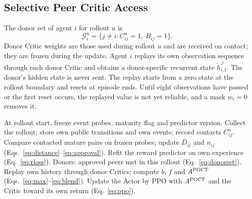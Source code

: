 \documentclass{article}
\begin{document}
\subsection{Selective Peer Critic Access}
The donor set of agent $i$ for rollout $u$ is
\begin{equation}\label{eq:donorset}
\mathcal G_i^u=\{j\ne i: C_{ij}^u=1,\ B_{ij}=1\}.
\end{equation}
Donor Critic weights are those used during rollout $u$ and are received on contact; they are frozen during the update. Agent $i$ replays its own observation sequence through each donor Critic and obtains a donor-specific recurrent state $\tilde h^{\,j}_{i,t}$. The donor's hidden state is never sent. The replay starts from a zero state at the rollout boundary and resets at episode ends. Until eight observations have passed or the first reset occurs, the replayed value is not yet reliable, and a mask $w_t=0$ removes it.

\begin{algorithm}[tb]
\caption{One PGCT update of agent $i$}
\label{alg:pgct}
\begin{algorithmic}[1]
\STATE At rollout start, freeze event probes, maturity flag and predictor version.
\STATE Collect the rollout; store own public transitions and own events; record contacts $C^u_{ij}$.
\STATE Compare contacted mature pairs on frozen probes; update $\bar D_{ij}$ and $n_{ij}$ (Eqs.~\ref{eq:distance}--\ref{eq:approval}).
\STATE Refit the reward predictor on own experience (Eq.~\ref{eq:rloss}).
\ENDIF
\STATE Donors: approved peers met in this rollout (Eq.~\ref{eq:donorset}).
\STATE Replay own history through donor Critics; compute $b$, $f$ and $A^{\rm PGCT}$ (Eqs.~\ref{eq:max}--\ref{eq:blend}).
\STATE Update the Actor by PPO with $A^{\rm PGCT}$ and the Critic toward its own return (Eq.~\ref{eq:ppo}).
\end{algorithmic}
\end{algorithm}
\end{document}
